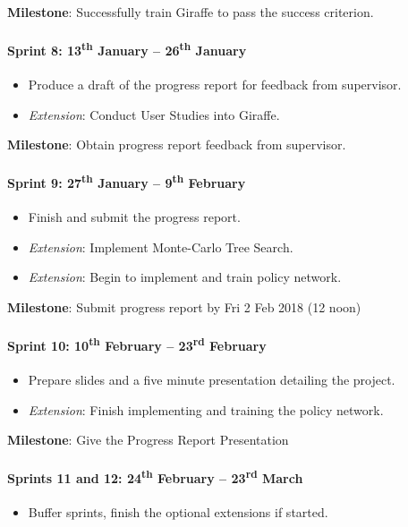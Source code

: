\documentclass[a4paper]{article}
\begin{document}
\textbf{Milestone}: Successfully train Giraffe to pass the success criterion.

\paragraph{Sprint 8: 13\textsuperscript{th} January -- 26\textsuperscript{th} January}
\begin{itemize}
\item Produce a draft of the progress report for feedback from supervisor.
\item \textit{Extension}: Conduct User Studies into Giraffe.
\end{itemize}
\textbf{Milestone}: Obtain progress report feedback from supervisor.

\paragraph{Sprint 9: 27\textsuperscript{th} January -- 9\textsuperscript{th} February}
\begin{itemize}
\item Finish and submit the progress report.
\item \textit{Extension}: Implement Monte-Carlo Tree Search.
\item \textit{Extension}: Begin to implement and train policy network.
\end{itemize}

\textbf{Milestone}: Submit progress report by Fri 2 Feb 2018 (12 noon)

\paragraph{Sprint 10: 10\textsuperscript{th} February -- 23\textsuperscript{rd} February}
\begin{itemize}
\item Prepare slides and a five minute presentation detailing the project.
\item \textit{Extension}: Finish implementing and training the policy network.
\end{itemize}

\textbf{Milestone}: Give the Progress Report Presentation

\paragraph{Sprints 11 and 12: 24\textsuperscript{th} February -- 23\textsuperscript{rd} March}
\begin{itemize}
\item Buffer sprints, finish the optional extensions if started.
\end{itemize}
\end{document}

